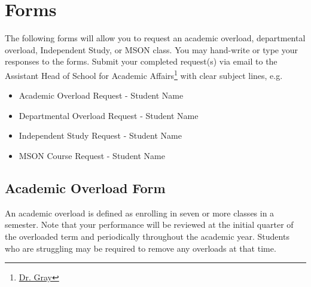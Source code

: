 \newpage
\section{Forms}

The following forms will allow you to request an academic overload, departmental overload, Independent Study, or MSON class.  You may hand-write or type your responses to the forms.  Submit your completed request(s) via email to the Assistant Head of School for Academic Affairs\footnote{\href{mailto:jonathan.gray@indiansprings.org}{Dr. Gray}} with clear subject lines, e.g. 

\begin{itemize}
  \item Academic Overload Request - Student Name
  \item Departmental Overload Request - Student Name  
  \item Independent Study Request - Student Name
  \item MSON Course Request - Student Name
\end{itemize}

\newpage

\subsection{Academic Overload Form}

An academic overload is defined as enrolling in seven or more classes in a semester. Note that your performance will be reviewed at the initial quarter of the overloaded term and periodically throughout the academic year.  Students who are struggling may be required to remove any overloads at that time.  

\vspace{.5cm}


